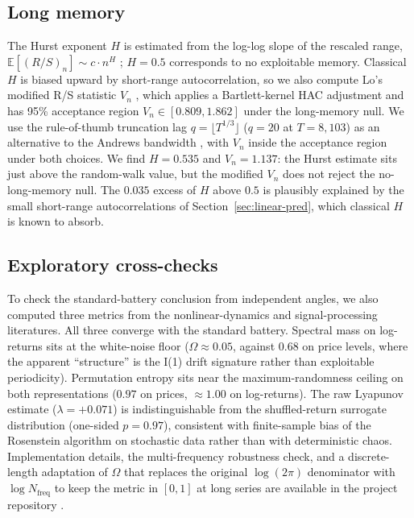 \documentclass[conference]{IEEEtran}
\begin{document}
\subsection{Long memory}
\label{sec:lr-hurst}

The Hurst exponent $H$ is estimated from the log-log slope of the
rescaled range, $\mathbb{E}[(R/S)_n] \sim c \cdot n^H$
\cite{hurst1951long}; $H = 0.5$ corresponds to no exploitable memory.
Classical $H$ is biased upward by short-range autocorrelation, so we
also compute Lo's modified R/S statistic $V_n$ \cite{lo1991long},
which applies a Bartlett-kernel HAC adjustment and has 95\%
acceptance region $V_n \in [0.809, 1.862]$ under the long-memory
null. We use the rule-of-thumb truncation lag
$q = \lfloor T^{1/3} \rfloor$ ($q = 20$ at $T = 8{,}103$) as an
alternative to the Andrews bandwidth
\cite{andrews1991heteroskedasticity}, with $V_n$ inside the
acceptance region under both choices. We find $H = 0.535$ and
$V_n = 1.137$: the Hurst estimate sits just above the random-walk
value, but the modified $V_n$ does not reject the no-long-memory
null. The $0.035$ excess of $H$ above $0.5$ is plausibly explained
by the small short-range autocorrelations of
Section~\ref{sec:linear-pred}, which classical $H$ is known to
absorb.

\subsection{Exploratory cross-checks}
\label{sec:exploratory}

To check the standard-battery conclusion from independent angles, we
also computed three metrics from the nonlinear-dynamics and
signal-processing literatures. All three converge with the standard
battery. Spectral mass on log-returns sits at the white-noise floor
($\Omega \approx 0.05$, against $0.68$ on price levels, where the
apparent ``structure'' is the I(1) drift signature rather than
exploitable periodicity). Permutation entropy sits near the
maximum-randomness ceiling on both representations ($0.97$ on prices,
$\approx 1.00$ on log-returns). The raw Lyapunov estimate
($\lambda = +0.071$) is indistinguishable from the shuffled-return
surrogate distribution (one-sided $p = 0.97$), consistent with
finite-sample bias of the Rosenstein algorithm on stochastic data
rather than with deterministic chaos. Implementation details, the
multi-frequency robustness check, and a discrete-length adaptation
of $\Omega$ that replaces the original $\log(2\pi)$ denominator with
$\log N_\mathrm{freq}$ to keep the metric in $[0, 1]$ at long series
are available in the project repository \cite{brinkman2026repo}.
\end{document}
